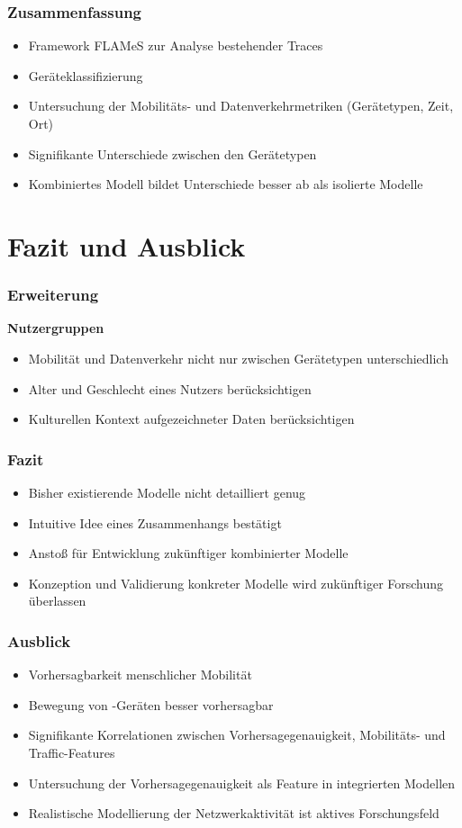 \documentclass{beamer}
\begin{document}
\begin{frame}
  \frametitle{Zusammenfassung}
  \begin{itemize}
    \item Framework FLAMeS zur Analyse bestehender Traces
    \item Geräteklassifizierung
    \item Untersuchung der Mobilitäts- und Datenverkehrmetriken (Gerätetypen, Zeit, Ort)
    \item Signifikante Unterschiede zwischen den Gerätetypen
    \item Kombiniertes Modell bildet Unterschiede besser ab als isolierte Modelle
  \end{itemize}  
\end{frame}

\section{Fazit und Ausblick}

\begin{frame}
  \frametitle{Erweiterung}
  \textbf{Nutzergruppen}
  \begin{itemize}
    \item Mobilität und Datenverkehr nicht nur zwischen Gerätetypen unterschiedlich
    \item Alter und Geschlecht eines Nutzers berücksichtigen
    \item Kulturellen Kontext aufgezeichneter Daten berücksichtigen    
  \end{itemize}
\end{frame}

\begin{frame}
  \frametitle{Fazit}
  \begin{itemize}
    \item Bisher existierende Modelle nicht detailliert genug
    \item Intuitive Idee eines Zusammenhangs bestätigt
    \item Anstoß für Entwicklung zukünftiger kombinierter Modelle
    \item Konzeption und Validierung konkreter Modelle wird zukünftiger Forschung überlassen    
  \end{itemize}
\end{frame}

\begin{frame}
  \frametitle{Ausblick}
  \begin{itemize}
    \item Vorhersagbarkeit menschlicher Mobilität
    \item Bewegung von -Geräten besser vorhersagbar
    \item Signifikante Korrelationen zwischen Vorhersagegenauigkeit, Mobilitäts- und Traffic-Features
    \item Untersuchung der Vorhersagegenauigkeit als Feature in integrierten Modellen
    \item Realistische Modellierung der Netzwerkaktivität ist aktives Forschungsfeld
  \end{itemize}  
\end{frame}
\end{document}
